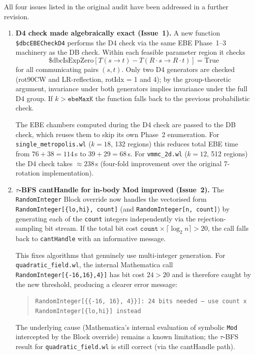 \documentclass[12pt,a4paper]{article}
\theoremstyle{critical}
\theoremstyle{remark}
\begin{document}
All four issues listed in the original audit have been addressed in a further revision.

\begin{enumerate}

\item \textbf{D4 check made algebraically exact (Issue~1).}
  A new function \texttt{\$dbcEBECheckD4} performs the D4 check via the
  same EBE Phase~1--3 machinery as the DB check.  Within each feasible
  parameter region it checks
  \[
    \$\text{dbcIsExpZero}\!\left[T(s\to t) - T(R\cdot s\to R\cdot t)\right] = \text{True}
  \]
  for all communicating pairs $(s,t)$.  Only two D4 generators are checked
  (rot90CW and LR-reflection, rotIdx = 1 and 4); by the group-theoretic
  argument, invariance under both generators implies invariance under the full
  D4 group.  If $k > \texttt{ebeMaxK}$ the function falls back to the previous
  probabilistic check.

  The EBE chambers computed during the D4 check are passed to the DB check,
  which reuses them to skip its own Phase~2 enumeration.  For
  \texttt{single\_metropolis.wl} ($k=18$, 132 regions) this reduces total EBE time
  from $76+38=114$\,s to $39+29=68$\,s.  For \texttt{vmmc\_2d.wl} ($k=12$, 512
  regions) the D4 check takes $\approx 238$\,s (four-fold improvement over the
  original 7-rotation implementation).

\item \textbf{$\tau$-BFS cantHandle for in-body Mod improved (Issue~2).}
  The \texttt{RandomInteger} Block override now handles the vectorised
  form \texttt{RandomInteger[\{lo,hi\}, count]} (and \texttt{RandomInteger[n, count]})
  by generating each of the \texttt{count} integers independently via the
  rejection-sampling bit stream.  If the total bit cost
  $\texttt{count} \times \lceil\log_2 n\rceil > 20$, the call falls back to
  \texttt{cantHandle} with an informative message.

  This fixes algorithms that genuinely use multi-integer generation.  For
  \texttt{quadratic\_field.wl}, the internal Mathematica call
  \texttt{RandomInteger[\{-16,16\},4\}]} has bit cost $24 > 20$ and is therefore
  caught by the new threshold, producing a clearer error message:
  \begin{quote}\small
    \texttt{RandomInteger[\{\{-16, 16\}, 4\}\}]: 24 bits needed ---
      use count x RandomInteger[\{lo,hi\}] instead}
  \end{quote}
  The underlying cause (Mathematica's internal evaluation of symbolic \texttt{Mod}
  intercepted by the Block override) remains a known limitation; the $\tau$-BFS
  result for \texttt{quadratic\_field.wl} is still correct (via the cantHandle path).


\end{enumerate}
\end{document}
